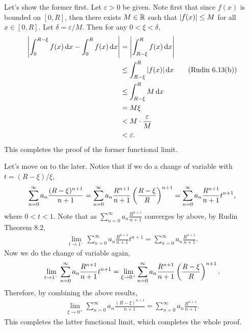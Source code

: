 \documentclass[12pt]{article}
\begin{document}
\begin{fproof}[4]
 Let's show the former first.
 Let \(\varepsilon > 0\) be given. Note first that since \(f(x)\) is bounded on \([0,R]\), then there exists \(M \in \mathbb {R}\) such that \(\left\lvert f(x) \right\rvert \leq M\) for all \(x \in [0, R]\).
 Let \(\delta = \varepsilon/M\).
 Then for any \(0 < \xi < \delta\),
 \begin{align*}
    \left\lvert \int_{0}^{R - \xi} f(x) \mathop{}\!\mathrm{d} x - \int_{0}^{R} f(x) \mathop{}\!\mathrm{d} x \right\rvert 
    &= \left\lvert \int_{R-\xi}^{R}f(x) \mathop{}\!\mathrm{d} x \right\rvert \\
    &\leq \int_{R - \xi}^{R} \left\lvert f(x) \right\rvert \mathop{}\!\mathrm{d} x \tag{Rudin 6.13(b)}\\
    &\leq \int_{R - \xi}^{R }M \mathop{}\!\mathrm{d} x\\
    & = M \xi \\
    & < M \cdot \frac{\varepsilon}{M}\\
    & < \varepsilon.
 \end{align*}
 This completes the proof of the former functional limit. 

 Let's move on to the later.
 Notice that if we do a change of variable with \(t = (R - \xi)/\xi\),
 \begin{align*}
    \sum_{n=0}^{\infty} a_n \frac{(R - \xi)^{n+1}}{n+1} = \sum_{n=0}^{\infty}a_n \frac{R^{n+1}}{n+1} \left( \frac{R - \xi}{R} \right)^{n+1} = \sum_{n=0}^{\infty}a_n \frac{R^{n+1}}{n+1} t^{n+1},
 \end{align*}
 where \(0 < t < 1\).
 Note that as \(\sum_{n=0}^{\infty} a_n \frac{R^{n+1}}{n+1}\) converges by above, by Rudin Theorem 8.2,
 \begin{align*}
    \lim_{t \to 1^-} \sum_{n=0}^{\infty} a_n \frac{R^{n+1}}{n+1} t^{n+1} = \sum_{n=0}^{\infty} a_n \frac{R^{n+1}}{n+1}.
 \end{align*}
 Now we do the change of variable again,
 \begin{align*}
    \lim_{t \to 1^-} \sum_{n=0}^{\infty} a_n \frac{R^{n+1}}{n+1} t^{n+1} = \lim_{\xi \to 0^+} \sum_{n=0}^{\infty}a_n \frac{R^{n+1}}{n+1} \left( \frac{R - \xi}{R} \right)^{n+1}.
 \end{align*}
 Therefore, by combining the above results,
 \begin{align*}
    \lim_{\xi \to 0^+} \sum_{n=0}^{\infty} a_n \frac{(R - \xi)^{n+1}}{n+1} = \sum_{n=0}^{\infty} a_n \frac{R^{n+1}}{n+1}.
 \end{align*}
 This completes the latter functional limit, which completes the whole proof.
\end{fproof}
\newpage
\end{document}

